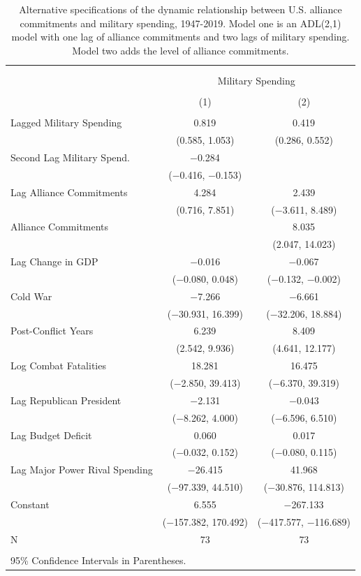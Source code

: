 \documentclass[12pt]{article}
\begin{document}
\begin{table}[!htbp] \centering 
\begin{tabular}{@{\extracolsep{5pt}}lcc} 
\\[-1.8ex]\hline \\[-1.8ex] 
\\[-1.8ex] & \multicolumn{2}{c}{Military Spending} \\ 
\\[-1.8ex] & (1) & (2)\\ 
\hline \\[-1.8ex] 
 Lagged Military Spending & 0.819$^{}$ & 0.419$^{}$ \\ 
  & (0.585, 1.053) & (0.286, 0.552) \\ 
  Second Lag Military Spend. & $-$0.284$^{}$ &  \\ 
  & ($-$0.416, $-$0.153) &  \\ 
  Lag Alliance Commitments & 4.284$^{}$ & 2.439 \\ 
  & (0.716, 7.851) & ($-$3.611, 8.489) \\ 
  Alliance Commitments &  & 8.035$^{}$ \\ 
  &  & (2.047, 14.023) \\ 
  Lag Change in GDP & $-$0.016 & $-$0.067$^{}$ \\ 
  & ($-$0.080, 0.048) & ($-$0.132, $-$0.002) \\ 
  Cold War & $-$7.266 & $-$6.661 \\ 
  & ($-$30.931, 16.399) & ($-$32.206, 18.884) \\ 
  Post-Conflict Years & 6.239$^{}$ & 8.409$^{}$ \\ 
  & (2.542, 9.936) & (4.641, 12.177) \\ 
  Log Combat Fatalities & 18.281$^{}$ & 16.475 \\ 
  & ($-$2.850, 39.413) & ($-$6.370, 39.319) \\ 
  Lag Republican President & $-$2.131 & $-$0.043 \\ 
  & ($-$8.262, 4.000) & ($-$6.596, 6.510) \\ 
  Lag Budget Deficit & 0.060 & 0.017 \\ 
  & ($-$0.032, 0.152) & ($-$0.080, 0.115) \\ 
  Lag Major Power Rival Spending & $-$26.415 & 41.968 \\ 
  & ($-$97.339, 44.510) & ($-$30.876, 114.813) \\ 
  Constant & 6.555 & $-$267.133$^{}$ \\ 
  & ($-$157.382, 170.492) & ($-$417.577, $-$116.689) \\ 
 N & 73 & 73 \\ 
\hline \\[-1.8ex] 
\multicolumn{3}{l}{95\% Confidence Intervals in Parentheses.} \\ 
\end{tabular} 
  \caption{Alternative specifications of the dynamic relationship between U.S. alliance commitments and military spending, 1947-2019. Model one is an ADL(2,1) model with one lag of alliance commitments and two lags of military spending. Model two adds the level of alliance commitments.} 
  \label{tab:adl-coefs-lags} 
\end{table} 
\end{document}
